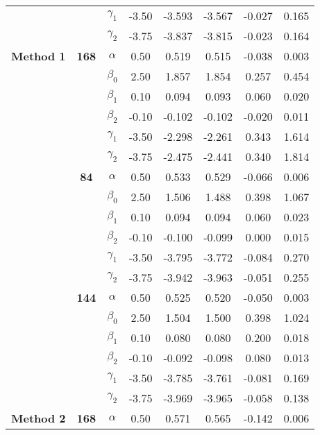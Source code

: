 \begin{table}[h]
\begin{tabular}[t]{>{}c>{}ccccccc}
 &  & $\gamma_1$ & -3.50 & -3.593 & -3.567 & -0.027 & 0.165\\

 &  & $\gamma_2$ & -3.75 & -3.837 & -3.815 & -0.023 & 0.164\\

\multirow{-18}{*}{\centering\arraybackslash \textbf{Method 1}} & \multirow{-6}{*}{\centering\arraybackslash \textbf{168}} & $\alpha$ & 0.50 & 0.519 & 0.515 & -0.038 & 0.003\\
\cmidrule{1-8}
 &  & $\beta_0$ & 2.50 & 1.857 & 1.854 & 0.257 & 0.454\\

 &  & $\beta_1$ & 0.10 & 0.094 & 0.093 & 0.060 & 0.020\\

 &  & $\beta_2$ & -0.10 & -0.102 & -0.102 & -0.020 & 0.011\\

 &  & $\gamma_1$ & -3.50 & -2.298 & -2.261 & 0.343 & 1.614\\

 &  & $\gamma_2$ & -3.75 & -2.475 & -2.441 & 0.340 & 1.814\\

 & \multirow{-6}{*}{\centering\arraybackslash \textbf{84}} & $\alpha$ & 0.50 & 0.533 & 0.529 & -0.066 & 0.006\\

 &  & $\beta_0$ & 2.50 & 1.506 & 1.488 & 0.398 & 1.067\\

 &  & $\beta_1$ & 0.10 & 0.094 & 0.094 & 0.060 & 0.023\\

 &  & $\beta_2$ & -0.10 & -0.100 & -0.099 & 0.000 & 0.015\\

 &  & $\gamma_1$ & -3.50 & -3.795 & -3.772 & -0.084 & 0.270\\

 &  & $\gamma_2$ & -3.75 & -3.942 & -3.963 & -0.051 & 0.255\\

 & \multirow{-6}{*}{\centering\arraybackslash \textbf{144}} & $\alpha$ & 0.50 & 0.525 & 0.520 & -0.050 & 0.003\\

 &  & $\beta_0$ & 2.50 & 1.504 & 1.500 & 0.398 & 1.024\\

 &  & $\beta_1$ & 0.10 & 0.080 & 0.080 & 0.200 & 0.018\\

 &  & $\beta_2$ & -0.10 & -0.092 & -0.098 & 0.080 & 0.013\\

 &  & $\gamma_1$ & -3.50 & -3.785 & -3.761 & -0.081 & 0.169\\

 &  & $\gamma_2$ & -3.75 & -3.969 & -3.965 & -0.058 & 0.138\\

\multirow{-18}{*}{\centering\arraybackslash \textbf{Method 2}} & \multirow{-6}{*}{\centering\arraybackslash \textbf{168}} & $\alpha$ & 0.50 & 0.571 & 0.565 & -0.142 & 0.006\\
\bottomrule
\end{tabular}
\end{table}
